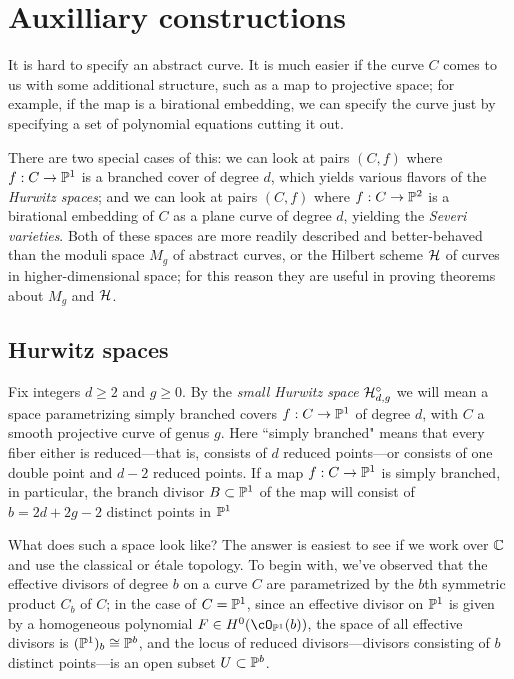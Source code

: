 \section{Auxilliary constructions}

It is hard to specify an abstract curve. It is much easier if the curve $C$ comes to us with some additional structure, such as a map to projective space; for example, if the map is a birational embedding, we can specify the curve just by specifying a set of polynomial equations cutting it out. 

There are two special cases of this: we can look at pairs $(C,f)$ where $f : C \to \PP^1$ is a branched cover of degree $d$, which yields various flavors of the \emph{Hurwitz spaces}; and we can look at pairs $(C,f)$ where $f : C \to \PP^2$ is a birational embedding of $C$ as a plane curve of degree $d$, yielding the \emph{Severi varieties}. Both of these spaces are more readily described and better-behaved than the moduli space $M_g$ of abstract curves, or the Hilbert scheme $\cH$ of curves in higher-dimensional space; for this reason they are useful in proving theorems about $M_g$ and $\cH$.

\subsection{Hurwitz spaces}\label{hurwitz spaces}

Fix integers $d \geq 2$ and $g \geq 0$. By the \emph{small Hurwitz space} $\cH^\circ_{d,g}$ we will mean a space parametrizing simply branched covers $f : C \to \PP^1$ of degree $d$, with $C$ a smooth projective curve of genus $g$. Here ``simply branched" means that every fiber  either is reduced---that is, consists of $d$ reduced points---or consists of one double point and $d-2$ reduced points. If a map $f : C \to \PP^1$ is simply branched, in particular, the branch divisor $B \subset \PP^1$ of the map will consist of $b = 2d+2g-2$ distinct points in $\PP^1$

What does such a space look like? The answer is easiest to see if we work over $\CC$ and use the classical or \'etale topology. To begin with, we've observed that the effective divisors of degree $b$ on a curve $C$ are parametrized by the $b$th symmetric product $C_b$ of $C$; in the case of $C = \PP^1$, since an effective divisor on $\PP^1$ is given by a homogeneous polynomial $F \in H^0(\cO_{\PP^1}(b))$, the space of all effective divisors is $(\PP^1)_b \cong \PP^b$, and the locus of reduced divisors---divisors consisting of $b$ distinct points---is an open subset $U \subset \PP^b$.


